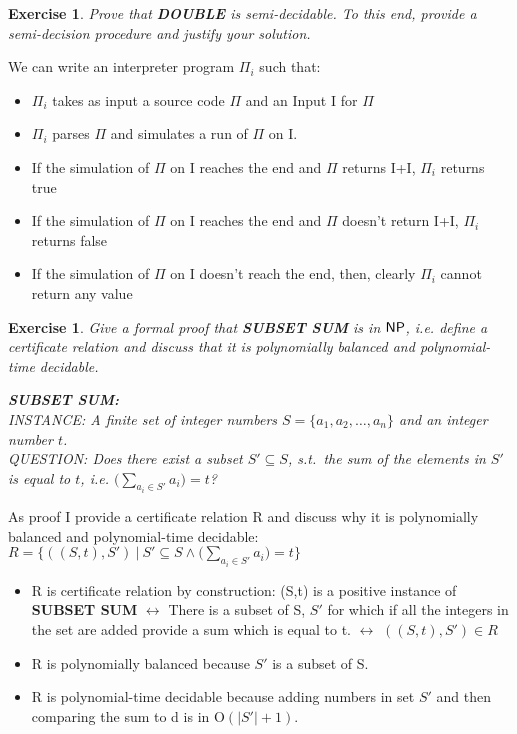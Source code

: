 \documentclass [11pt]{article}
\newtheorem{exercise}[theorem]{Exercise}
\newcommand{\ccfont}[1]{\protect\mathsf{#1}}
\newcommand{\NP}{\ccfont{NP}}
\newcommand{\bigO}{\mathrm{O}}
\newcommand{\solution}[1]{\noindent {\bf Solution.}  #1}
\begin{document}
\begin{exercise}
 Prove that \textbf{DOUBLE} is semi-decidable. To this end, provide a semi-decision procedure and justify your solution.
\end{exercise}


\solution{
We can write an interpreter program $\Pi_i$ such that:\\
\begin{itemize}
  \item{$\Pi_i$ takes as input a source code $\Pi$ and an Input I for $\Pi$}
  \item{$\Pi_i$ parses $\Pi$ and simulates a run of $\Pi$ on I.}
  \item{If the simulation of $\Pi$ on I reaches the end and $\Pi$ returns I+I, $\Pi_i$ returns true}
  \item{If the simulation of $\Pi$ on I reaches the end and $\Pi$ doesn't return I+I, $\Pi_i$ returns false}
  \item{If the simulation of $\Pi$ on I doesn't reach the end, then, clearly $\Pi_i$ cannot return any value }
\end{itemize}
}


\begin{exercise}
  Give a formal proof that \textbf{SUBSET SUM} is in $\NP$, i.e. define a
  certificate relation and discuss that it is polynomially balanced and
  polynomial-time decidable.
  
\medskip

\noindent \textbf{SUBSET SUM:} \\
INSTANCE: A finite set of integer numbers $S=\{a_1, a_2, \ldots, a_n\}$ and an integer number $t$. \\
QUESTION: Does there exist a subset $S'\subseteq S$, s.t.\ the sum of the elements in $S'$  is equal to $t$, i.e. $\big(\sum_{a_i \in S'} a_i\big) = t$?
  
\end{exercise}


\solution{
  As proof I provide a certificate relation R and discuss why it is polynomially balanced and polynomial-time decidable:\\

  $R=\{((S,t),S') \ | \  S' \subseteq S \wedge \big(\sum_{a_i \in S'} a_i\big) = t \}$\\
  \begin{itemize}
    \item{
        R is certificate relation by construction: (S,t) is a positive instance of \textbf{SUBSET SUM} $\leftrightarrow$
        There is a subset of S, $S'$ for which if all the integers in the set are added provide a sum which is equal to t. $\leftrightarrow$ 
      $((S,t),S')\in R$}
    \item{R is polynomially balanced because $S'$ is a subset of S.}
    \item{R is polynomial-time decidable because adding numbers in set $S'$ and then comparing the sum to d is in $\bigO(|S'|+1)$}.
  \end{itemize}
}
\end{document}
